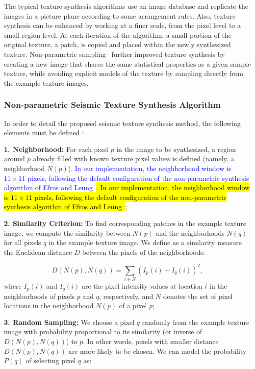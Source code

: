 \documentclass{ieeeaccess}
\providecommand{\DIFaddbegin}{} %
\providecommand{\DIFaddend}{} %
\newcommand{\DIFaddincludegraphics}[2][]{{\color{blue}\fbox{\DIFOincludegraphics[#1]{#2}}}} %
\DeclareRobustCommand{\DIFaddbegin}{\DIFOaddbegin \let\includegraphics\DIFaddincludegraphics} %
\DeclareRobustCommand{\DIFaddend}{\DIFOaddend \let\includegraphics\DIFOincludegraphics} %
\providecommand{\DIFadd}[1]{\ifmmode\textcolor{blue}{#1}\else\hl{#1}\fi}
\renewcommand{\DIFadd}[1]{\ifmmode\textcolor{blue}{#1}\else\hl{#1}\fi}
\begin{document}
The typical texture synthesis algorithms use an image database and replicate the images in a picture plane according to some arrangement rules. Also, texture synthesis can be enhanced by working at a finer scale, from the pixel level to a small region level. At each iteration of the algorithm, a small portion of the original texture, a patch, is copied and placed within the newly synthesized texture. Non-parametric sampling~\cite{Efros1999} further improved texture synthesis by creating a new image that shares the same statistical properties as a given sample texture, while avoiding explicit models of the texture by sampling directly from the example texture images.


\subsubsection{Non-parametric Seismic Texture Synthesis Algorithm}

In order to detail the proposed seismic texture synthesis method, the following elements must be defined :

\textbf{1. Neighborhood:} For each pixel $p$ in the image to be synthesized, a region around $p$ already filled with known texture pixel values is defined (namely, a neighborhood $N(p)$)\DIFaddbegin \DIFadd{. In our implementation, the neighborhood window is $11 \times 11$ pixels, following the default configuration of the non-parametric synthesis algorithm of Efros and Leung~\cite{Efros1999}}\DIFaddend ;

\textbf{2. Similarity Criterion:} To find corresponding patches in the example texture image, we compute the similarity between $N(p)$ and the neighborhoods $N(q)$ for all pixels $q$ in the example texture image. We define as a similarity measure the Euclidean distance $D$ between the pixels of the neighborhoods:

\begin{equation}
D(N(p), N(q)) = \sum_{i \in N} \left( I_p(i) - I_q(i) \right)^2,
\end{equation}
where $I_p(i)$ and $I_q(i)$ are the pixel intensity values at location $i$ in the neighborhoods of pixels $p$ and $q$, respectively, and $N$ denotes the set of pixel locations in the neighborhood $N(p)$ of a pixel $p$;

\textbf{3. Random Sampling:} We choose a pixel $q$ randomly from the example texture image with probability proportional to its similarity (or inverse of $D(N(p), N(q))$) to $p$. In other words, pixels with smaller distance $D(N(p), N(q))$ are more likely to be chosen. We can model the probability $P(q)$ of selecting pixel $q$ as:
\end{document}
